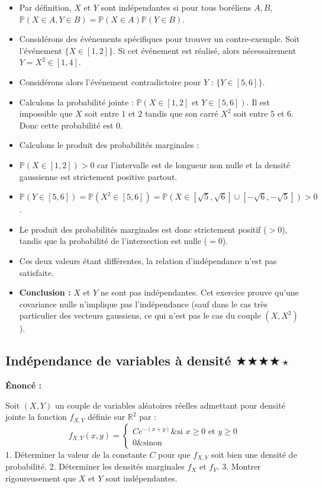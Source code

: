 \documentclass[11pt,a4paper]{article}
\begin{document}
\begin{itemize}
\item Par définition, $X$ et $Y$ sont indépendantes si pour tous boréliens $A, B$, $\mathbb{P}(X \in A, Y \in B) = \mathbb{P}(X \in A)\mathbb{P}(Y \in B)$.
\item Considérons des événements spécifiques pour trouver un contre-exemple. Soit l'événement $\{X \in [1, 2]\}$. Si cet événement est réalisé, alors nécessairement $Y = X^2 \in [1, 4]$.
\item Considérons alors l'événement contradictoire pour $Y$ : $\{Y \in [5, 6]\}$.
\item Calculons la probabilité jointe : $\mathbb{P}(X \in [1, 2] \text{ et } Y \in [5, 6])$. Il est impossible que $X$ soit entre $1$ et $2$ tandis que son carré $X^2$ soit entre $5$ et $6$. Donc cette probabilité est $0$.
\item Calculons le produit des probabilités marginales :
\item $\mathbb{P}(X \in [1, 2]) > 0$ car l'intervalle est de longueur non nulle et la densité gaussienne est strictement positive partout.
\item $\mathbb{P}(Y \in [5, 6]) = \mathbb{P}(X^2 \in [5, 6]) = \mathbb{P}(X \in [\sqrt{5}, \sqrt{6}] \cup [-\sqrt{6}, -\sqrt{5}]) > 0$.
\item Le produit des probabilités marginales est donc strictement positif ($>0$), tandis que la probabilité de l'intersection est nulle ($=0$).
\item Ces deux valeurs étant différentes, la relation d'indépendance n'est pas satisfaite.
\item \textbf{Conclusion :} $X$ et $Y$ ne sont pas indépendantes. Cet exercice prouve qu'une covariance nulle n'implique pas l'indépendance (sauf dans le cas très particulier des vecteurs gaussiens, ce qui n'est pas le cas du couple $(X, X^2)$).
\end{itemize}

\subsection*{ Indépendance de variables à densité \quad $\bigstar\bigstar\bigstar\bigstar\star$}

\textbf{Énoncé :}

Soit $(X, Y)$ un couple de variables aléatoires réelles admettant pour densité jointe la fonction $f_{X,Y}$ définie sur $\mathbb{R}^2$ par :
$$ f_{X,Y}(x,y) = \begin{cases} C e^{-(x+y)} \& \text{si } x \geq 0 \text{ et } y \geq 0 \\ 0 \& \text{sinon} \end{cases} $$
1. Déterminer la valeur de la constante $C$ pour que $f_{X,Y}$ soit bien une densité de probabilité.
2. Déterminer les densités marginales $f_X$ et $f_Y$.
3. Montrer rigoureusement que $X$ et $Y$ sont indépendantes.
\end{document}
